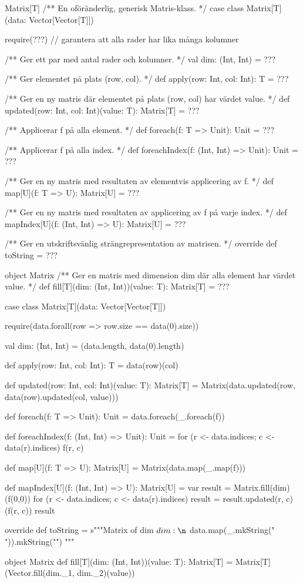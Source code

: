 \begin{ScalaSpec}{Matrix[T]}
/** En oföränderlig, generisk Matris-klass. */
case class Matrix[T](data: Vector[Vector[T]]) {
  require(???)  // garantera att alla rader har lika många kolumner

  /** Ger ett par med antal rader och kolumner. */
  val dim: (Int, Int) = ???

  /** Ger elementet på plats (row, col). */
  def apply(row: Int, col: Int): T = ???

  /** Ger en ny matris där elementet på plats (row, col) har värdet value. */
  def updated(row: Int, col: Int)(value: T): Matrix[T] =  ???

  /** Applicerar f på alla element. */
  def foreach(f: T => Unit): Unit = ???

  /** Applicerar f på alla index. */
  def foreachIndex(f: (Int, Int) => Unit): Unit = ???

  /** Ger en ny matris med resultaten av elementvis applicering av f. */
  def map[U](f: T => U): Matrix[U] = ???

  /** Ger en ny matris med resultaten av applicering av f på varje index. */
  def mapIndex[U](f: (Int, Int) => U): Matrix[U] = ???

  /** Ger en utskriftsvänlig strängrepresentation av matrisen. */
  override def toString = ???
}

object Matrix {
  /** Ger en matris med dimension dim där alla element har värdet value. */
  def fill[T](dim: (Int, Int))(value: T): Matrix[T] = ???
}
\end{ScalaSpec}

\SOLUTION


\TaskSolved \what

\begin{CodeSmall}
case class Matrix[T](data: Vector[Vector[T]]) {
  require(data.forall(row => row.size == data(0).size))

  val dim: (Int, Int) = (data.length, data(0).length)

  def apply(row: Int, col: Int): T = data(row)(col)

  def updated(row: Int, col: Int)(value: T): Matrix[T] =
    Matrix(data.updated(row, data(row).updated(col, value)))

  def foreach(f: T => Unit): Unit = data.foreach(_.foreach(f))

  def foreachIndex(f: (Int, Int) => Unit): Unit =
    for (r <- data.indices; c <- data(r).indices) f(r, c)

  def map[U](f: T => U): Matrix[U] = Matrix(data.map(_.map(f)))

  def mapIndex[U](f: (Int, Int) => U): Matrix[U] = {
    var result = Matrix.fill(dim)(f(0,0))
    for (r <- data.indices; c <- data(r).indices) {
      result = result.updated(r, c)(f(r, c))
    }
    result
  }

  override def toString =
    s"""Matrix of dim $dim:\n${ data.map(_.mkString(" ")).mkString("\n") }"""
}

object Matrix {
  def fill[T](dim: (Int, Int))(value: T): Matrix[T] =
    Matrix[T](Vector.fill(dim._1, dim._2)(value))
}
\end{CodeSmall}


